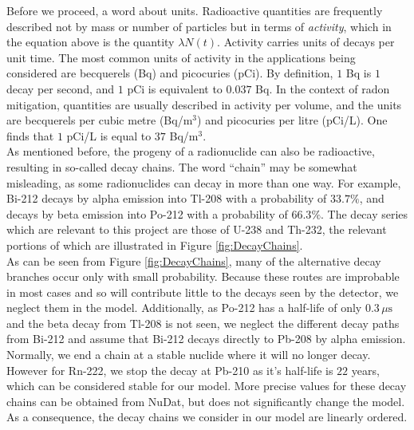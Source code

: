 \documentclass[11pt]{m2pi}
\begin{document}
Before we proceed, a word about units. Radioactive quantities are frequently described not by mass or number of particles but in terms of \textit{activity}, which in the equation above is the quantity $\lambda N(t)$. Activity carries units of decays per unit time. The most common units of activity in the applications being considered are becquerels (Bq) and picocuries (pCi). By definition, $1$ Bq is $1$ decay per second, and $1$ pCi is equivalent to $0.037$ Bq. In the context of radon mitigation, quantities are usually described in activity per volume, and the units are becquerels per cubic metre (Bq/m$^3$) and picocuries per litre (pCi/L). One finds that $1$ pCi/L is equal to $37$ Bq/m$^3$. \\


As mentioned before, the progeny of a radionuclide can also be radioactive, resulting in so-called decay chains.
The word ``chain'' may be somewhat misleading, as some radionuclides can decay in more than one way.
For example, Bi-212 decays by alpha emission into Tl-208 with a probability of $33.7\%$, and decays by beta emission into Po-212 with a probability of $66.3\%$.
The decay series which are relevant to this project are those of U-238 and Th-232, the relevant portions of which are illustrated in Figure \ref{fig:DecayChains}. \\

As can be seen from Figure \ref{fig:DecayChains}, many of the alternative decay branches occur only with small probability. Because these routes are improbable in most cases and so will contribute little to the decays seen by the detector, we neglect them in the model. Additionally, as Po-212 has a half-life of only $0.3 \, \mu\mathrm{s}$ and the beta decay from Tl-208 is not seen,
we neglect the different decay paths from Bi-212 and assume that Bi-212 decays directly to Pb-208 by alpha emission. Normally, we end a chain at a stable nuclide where it will no longer decay. However for Rn-222, we stop the decay at Pb-210 as it's half-life is $22$ years, which can be considered stable for our model. More precise values for these decay chains can be obtained from NuDat\cite{NuDat}, but does not significantly change the model.
 As a consequence, the decay chains we consider in our model are linearly ordered. \\
\end{document}
